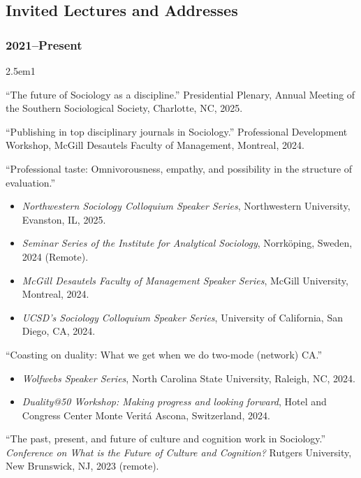 \documentclass[
]{article}
\providecommand{\tightlist}{%
  \setlength{\itemsep}{0pt}\setlength{\parskip}{0pt}}
\newenvironment{cventry}{\begin{hangparas}{2.5em}{1}}{\end{hangparas}}
\begin{document}
\subsection{Invited Lectures and
Addresses}\label{invited-lectures-and-addresses}

\subsubsection{2021--Present}\label{present-2}

\begin{cventry}

``The future of Sociology as a discipline.'' Presidential Plenary,
Annual Meeting of the Southern Sociological Society, Charlotte, NC,
2025.

``Publishing in top disciplinary journals in Sociology.'' Professional
Development Workshop, McGill Desautels Faculty of Management, Montreal,
2024.

``Professional taste: Omnivorousness, empathy, and possibility in the
structure of evaluation.''

\begin{itemize}
\tightlist
\item
  \emph{Northwestern Sociology Colloquium Speaker Series}, Northwestern
  University, Evanston, IL, 2025.
\item
  \emph{Seminar Series of the Institute for Analytical Sociology},
  Norrköping, Sweden, 2024 (Remote).
\item
  \emph{McGill Desautels Faculty of Management Speaker Series}, McGill
  University, Montreal, 2024.
\item
  \emph{UCSD's Sociology Colloquium Speaker Series}, University of
  California, San Diego, CA, 2024.
\end{itemize}

``Coasting on duality: What we get when we do two-mode (network) CA.''

\begin{itemize}
\tightlist
\item
  \emph{Wolfwebs Speaker Series}, North Carolina State University,
  Raleigh, NC, 2024.
\item
  \emph{Duality@50 Workshop: Making progress and looking forward}, Hotel
  and Congress Center Monte Veritá Ascona, Switzerland, 2024.
\end{itemize}

``The past, present, and future of culture and cognition work in
Sociology.'' \emph{Conference on What is the Future of Culture and
Cognition?} Rutgers University, New Brunswick, NJ, 2023 (remote).


\end{cventry}
\end{document}
